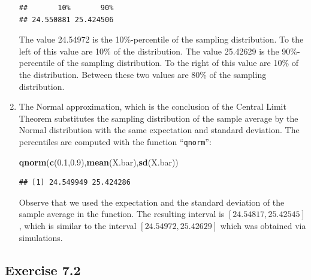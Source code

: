 \documentclass[]{krantz}
\makeatletter
\newenvironment{Shaded}{\begin{snugshade}}{\end{snugshade}}
\newcommand{\FloatTok}[1]{\textcolor[rgb]{0.00,0.00,0.81}{#1}}
\newcommand{\KeywordTok}[1]{\textcolor[rgb]{0.13,0.29,0.53}{\textbf{#1}}}
\newcommand{\NormalTok}[1]{#1}
\newenvironment{kframe}{%
\medskip{}
\setlength{\fboxsep}{.8em}
 \def\at@end@of@kframe{}%
 \ifinner\ifhmode%
  \def\at@end@of@kframe{\end{minipage}}%
  \begin{minipage}{\columnwidth}%
 \fi\fi%
 \def\FrameCommand##1{\hskip\@totalleftmargin \hskip-\fboxsep
 \colorbox{shadecolor}{##1}\hskip-\fboxsep
     \hskip-\linewidth \hskip-\@totalleftmargin \hskip\columnwidth}%
 \MakeFramed {\advance\hsize-\width
   \@totalleftmargin\z@ \linewidth\hsize
   \@setminipage}}%
 {\par\unskip\endMakeFramed%
 \at@end@of@kframe}
\renewenvironment{Shaded}{\begin{kframe}}{\end{kframe}}
\theoremstyle{definition}
\theoremstyle{definition}
\theoremstyle{definition}
\theoremstyle{remark}
\makeatother
\begin{document}
\begin{enumerate}
\begin{verbatim}
##       10%       90% 
## 24.550881 25.424506
\end{verbatim}

  The value 24.54972 is the 10\%-percentile of the sampling distribution.
  To the left of this value are 10\% of the distribution. The value
  25.42629 is the 90\%-percentile of the sampling distribution. To the
  right of this value are 10\% of the distribution. Between these two
  values are 80\% of the sampling distribution.
\item
  The Normal approximation, which is
  the conclusion of the Central Limit Theorem substitutes the sampling
  distribution of the sample average by the Normal distribution with the
  same expectation and standard deviation. The percentiles are computed
  with the function ``\texttt{qnorm}'':

\begin{Shaded}
\begin{Highlighting}[]
\KeywordTok{qnorm}\NormalTok{(}\KeywordTok{c}\NormalTok{(}\FloatTok{0.1}\NormalTok{,}\FloatTok{0.9}\NormalTok{),}\KeywordTok{mean}\NormalTok{(X.bar),}\KeywordTok{sd}\NormalTok{(X.bar))}
\end{Highlighting}
\end{Shaded}

\begin{verbatim}
## [1] 24.549949 25.424286
\end{verbatim}

  Observe that we used the expectation and the standard deviation of the
  sample average in the function. The resulting interval is
  \([24.54817, 25.42545]\), which is similar to the interval
  \([24.54972, 25.42629]\) which was obtained via simulations.
\end{enumerate}

\hypertarget{exercise-7.2}{%
\subsection*{Exercise 7.2}\label{exercise-7.2}}
\end{document}
